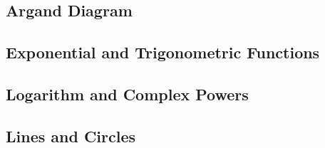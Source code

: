 \documentclass[12pt]{article}
\begin{document}
\subsection{Argand Diagram}


\subsection{Exponential and Trigonometric Functions}

\subsection{Logarithm and Complex Powers}

\subsection{Lines and Circles}
\end{document}
